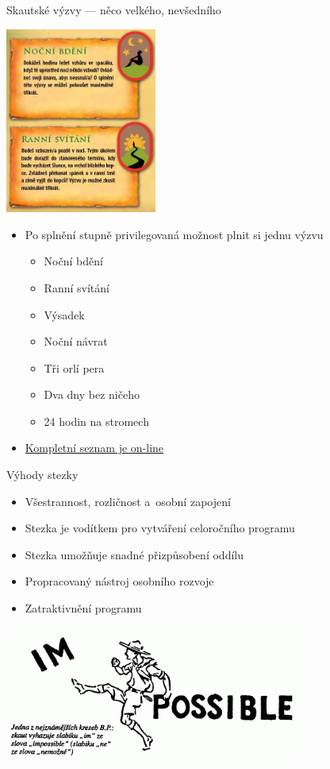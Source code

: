 \documentclass[hyperref={bookmarks=true, unicode=true, colorlinks=true, plainpages=false, pdfkeywords={Skaut, Junak, Skauting, Vychovna metoda}, linkcolor=OrangeRed, anchorcolor=OrangeRed, citecolor=RawSienna, filecolor=RawSienna, menucolor=OrangeRed, urlcolor=RawSienna, pdftex}, compress, xelatex, xcolor=dvipsnames, print]{beamer}
\begin{document}
\begin{frame}{Skautské výzvy --- něco velkého, nevšedního}
\begin{multicols}{2}
\includegraphics[height=6.1cm]{vyzvy.png}
\begin{itemize}
\item Po splnění stupně privilegovaná možnost plnit si jednu výzvu
 \begin{itemize}
 \item Noční bdění
 \item Ranní svítání
 \item Výsadek
 \item Noční návrat
 \item Tři orlí pera
 \item Dva dny bez ničeho
 \item 24 hodin na stromech
 \end{itemize}
 \item \href{http://krizovatka.skaut.cz/oddil/program/skauti-skautky/skauti-skautky-stezky/skauti-skautky-stezky-vyzvy}{Kompletní seznam je on-line}
\end{itemize}
\end{multicols}
\end{frame}

\begin{frame}{Výhody stezky}
\begin{itemize}
\item Všestrannost, rozličnost a~osobní zapojení
\item Stezka je vodítkem pro vytváření celoročního programu
\item Stezka umožňuje snadné přizpůsobení oddílu
\item Propracovaný nástroj osobního rozvoje
\item Zatraktivnění programu
\end{itemize}
\begin{center}
\includegraphics[height=4.5cm]{im-possible_m.png}
\end{center}
\end{frame}
\end{document}
